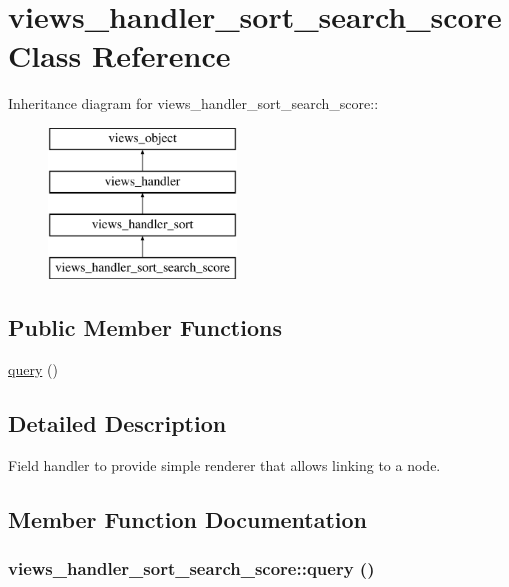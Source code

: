\hypertarget{classviews__handler__sort__search__score}{
\section{views\_\-handler\_\-sort\_\-search\_\-score Class Reference}
\label{classviews__handler__sort__search__score}
}
Inheritance diagram for views\_\-handler\_\-sort\_\-search\_\-score::\begin{figure}[H]
\begin{center}
\leavevmode
\includegraphics[height=4cm]{classviews__handler__sort__search__score}
\end{center}
\end{figure}
\subsection*{Public Member Functions}
\begin{CompactItemize}
\item 
\hyperlink{classviews__handler__sort__search__score_7d144db57e043dc594021228f8567726}{query} ()
\end{CompactItemize}


\subsection{Detailed Description}
Field handler to provide simple renderer that allows linking to a node. 

\subsection{Member Function Documentation}
\hypertarget{classviews__handler__sort__search__score_7d144db57e043dc594021228f8567726}{
\subsubsection[{query}]{\setlength{\rightskip}{0pt plus 5cm}views\_\-handler\_\-sort\_\-search\_\-score::query ()}}
\label{classviews__handler__sort__search__score_7d144db57e043dc594021228f8567726}


